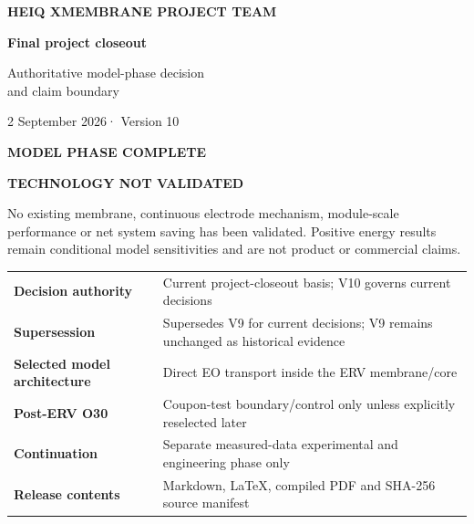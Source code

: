 \documentclass[10pt,a4paper]{article}
\newcommand{\sans}{\fontfamily{qhv}\selectfont}
\begin{document}
\thispagestyle{empty}
\vspace*{8mm}
\begin{tcolorbox}[enhanced,colback=Navy,colframe=Navy,boxrule=0pt,arc=0mm,left=12mm,right=12mm,top=12mm,bottom=12mm]
{\sans\bfseries\large\color{white}HEIQ XMEMBRANE PROJECT TEAM}\par
\vspace{9mm}
{\sans\bfseries\fontsize{28}{32}\selectfont\color{white}Final project closeout}\par
\vspace{2mm}
{\sans\fontsize{18}{21}\selectfont\color{white}Authoritative model-phase decision\\and claim boundary}\par
\vspace{8mm}
{\sans\large\color{white}2 September 2026\quad · \quad Version 10}
\end{tcolorbox}

\vspace{9mm}
\begin{stopbox}
{\sans\bfseries\Large\color{Red}MODEL PHASE COMPLETE}\par
{\sans\bfseries\Large\color{Red}TECHNOLOGY NOT VALIDATED}\par
\vspace{2mm}
No existing membrane, continuous electrode mechanism, module-scale performance
or net system saving has been validated. Positive energy results remain
conditional model sensitivities and are not product or commercial claims.
\end{stopbox}

\vspace{5mm}
\begin{tabularx}{\textwidth}{@{}p{43mm}Y@{}}
\textbf{Decision authority} & Current project-closeout basis; V10 governs current decisions \\
\textbf{Supersession} & Supersedes V9 for current decisions; V9 remains unchanged as historical evidence \\
\textbf{Selected model architecture} & Direct EO transport inside the ERV membrane/core \\
\textbf{Post-ERV O30} & Coupon-test boundary/control only unless explicitly reselected later \\
\textbf{Continuation} & Separate measured-data experimental and engineering phase only \\
\textbf{Release contents} & Markdown, LaTeX, compiled PDF and SHA-256 source manifest \\
\end{tabularx}
\end{document}
